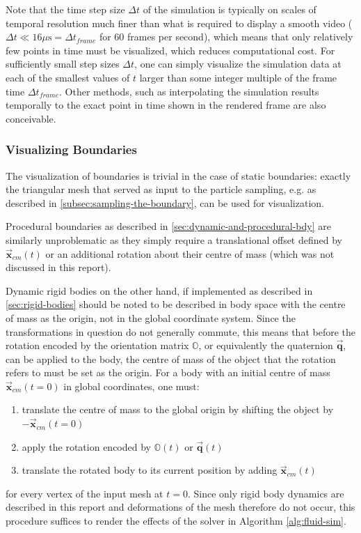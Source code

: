 \documentclass[oneside, a4paper]{book}
\newcommand\vek[1]{\vec{\bm{#1}}}
\newcommand\br[1]{\left(#1\right)}
\begin{document}
  Note that the time step size $\Delta t$ of the simulation is typically on scales of temporal resolution much finer than what is required to display a smooth video ($\Delta t \ll 16\si{\mu\second} = \Delta t_{frame}$ for 60 frames per second), which means that only relatively few points in time must be visualized, which reduces computational cost. For sufficiently small step sizes $\Delta t$, one can simply visualize the simulation data at each of the smallest values of $t$ larger than some integer multiple of the frame time $\Delta t_{frame}$. Other methods, such as interpolating the simulation results temporally to the exact point in time shown in the rendered frame are also conceivable.

  \subsubsection{Visualizing Boundaries}
  The visualization of boundaries is trivial in the case of static boundaries: exactly the triangular mesh that served as input to the particle sampling, e.g. as described in \autoref{subsec:sampling-the-boundary}, can be used for visualization.

  Procedural boundaries as described in \autoref{sec:dynamic-and-procedural-bdy} are similarly unproblematic as they simply require a translational offset defined by $\vek{x}_{cm}\br{t}$ or an additional rotation about their centre of mass (which was not discussed in this report). 

  Dynamic rigid bodies on the other hand, if implemented as described in \autoref{sec:rigid-bodies} should be noted to be described in body space with the centre of mass as the origin, not in the global coordinate system. Since the transformations in question do not generally commute, this means that before the rotation encoded by the orientation matrix $\mathds{O}$, or equivalently the quaternion $\vek{q}$, can be applied to the body, the centre of mass of the object that the rotation refers to must be set as the origin. For a body with an initial centre of mass $\vek{x}_{cm}\br{t=0}$ in global coordinates, one must:
  \begin{enumerate}
    \item translate the centre of mass to the global origin by shifting the object by $-\vek{x}_{cm}\br{t=0}$
    \item apply the rotation encoded by $\mathds{O}\br{t}$ or $\vek{q}\br{t}$
    \item translate the rotated body to its current position by adding $\vek{x}_{cm}\br{t}$
  \end{enumerate}
  for every vertex of the input mesh at $t=0$. Since only rigid body dynamics are described in this report and deformations of the mesh therefore do not occur, this procedure suffices to render the effects of the solver in Algorithm \ref{alg:fluid-sim}.
\end{document}
